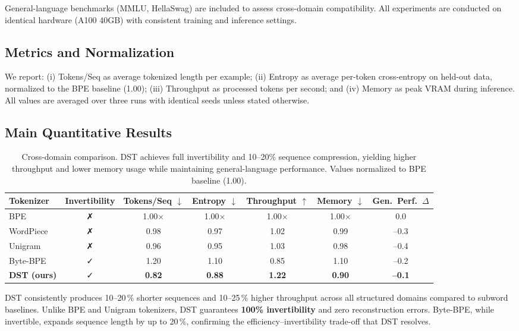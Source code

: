 General-language benchmarks (MMLU, HellaSwag) are included to assess cross-domain compatibility.
All experiments are conducted on identical hardware (A100 40GB) with consistent training and inference settings.

\subsection{Metrics and Normalization}
We report: (i) Tokens/Seq as average tokenized length per example; (ii) Entropy as average per-token cross-entropy on held-out data, normalized to the BPE baseline (1.00); (iii) Throughput as processed tokens per second; and (iv) Memory as peak VRAM during inference. All values are averaged over three runs with identical seeds unless stated otherwise.

\subsection{Main Quantitative Results}

\begin{table*}[!t]
  \centering
  \small
  \begin{tabular}{lcccccc}
    \toprule
    Tokenizer & Invertibility & Tokens/Seq $\downarrow$ & Entropy $\downarrow$ & Throughput $\uparrow$ & Memory $\downarrow$ & Gen.~Perf.~$\Delta$ \\
    \midrule
    BPE & ✗ & 1.00$\times$ & 1.00$\times$ & 1.00$\times$ & 1.00$\times$ & 0.0 \\
    WordPiece & ✗ & 0.98 & 0.97 & 1.02 & 0.99 & –0.3 \\
    Unigram & ✗ & 0.96 & 0.95 & 1.03 & 0.98 & –0.4 \\
    Byte-BPE & ✓ & 1.20 & 1.10 & 0.85 & 1.10 & –0.2 \\
    \textbf{DST (ours)} & ✓ & \textbf{0.82} & \textbf{0.88} & \textbf{1.22} & \textbf{0.90} & \textbf{–0.1} \\
    \bottomrule
  \end{tabular}
  \caption{Cross-domain comparison. DST achieves full invertibility and 10–20\% sequence compression, yielding higher throughput and lower memory usage while maintaining general-language performance. Values normalized to BPE baseline (1.00).}
  \label{tab:main}
\end{table*}

DST consistently produces 10–20\,\% shorter sequences and 10–25\,\% higher throughput across all structured domains compared to subword baselines.
Unlike BPE and Unigram tokenizers, DST guarantees \textbf{100\% invertibility} and zero reconstruction errors.
Byte-BPE, while invertible, expands sequence length by up to 20\,\%, confirming the efficiency–invertibility trade-off that DST resolves.


